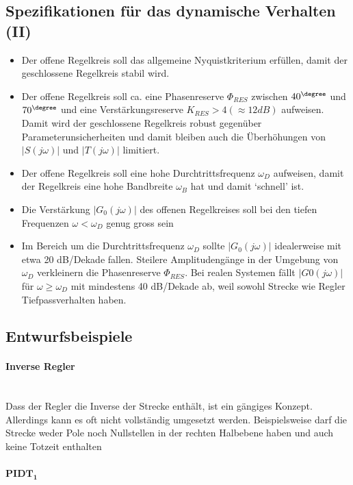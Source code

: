 \subsection{Spezifikationen für das dynamische Verhalten (II) }
\begin{itemize}
\item Der offene Regelkreis soll das allgemeine Nyquistkriterium
erfüllen, damit der geschlossene Regelkreis stabil wird.
\item Der offene Regelkreis soll ca. eine Phasenreserve $\Phi_{RES}$ zwischen $40^{\degree}$ und $70^{\degree}$
und eine Verstärkungsreserve $K_{RES} > 4 (\approx 12dB)$ aufweisen. Damit wird der
geschlossene Regelkreis robust gegenüber Parameterunsicherheiten und damit
bleiben auch die Überhöhungen von $|S(j\omega)|$ und $|T(j\omega)|$ limitiert.
\item Der offene Regelkreis soll eine hohe Durchtrittsfrequenz $\omega_D$ aufweisen, damit
der Regelkreis eine hohe Bandbreite $\omega_B$ hat und damit ‘schnell’ ist.
\item Die Verstärkung $|G_0(j\omega)|$ des offenen Regelkreises soll bei den tiefen Frequenzen
$\omega < \omega_D$ genug gross sein
\item Im Bereich um die Durchtrittsfrequenz $\omega_D$ sollte $|G_0(j\omega)|$ idealerweise mit
etwa 20 dB/Dekade fallen. Steilere Amplitudengänge in der Umgebung von
$\omega_D$ verkleinern die Phasenreserve $\Phi_{RES}$.\newline
Bei realen Systemen fällt $|G0(j\omega)|$ für $\omega \geqslant \omega_D$ mit mindestens 40 dB/Dekade
ab, weil sowohl Strecke wie Regler Tiefpassverhalten haben.
\end{itemize}
\subsection{Entwurfsbeispiele }
\paragraph{Inverse Regler } \mbox{} \\

    Dass der Regler die Inverse der Strecke enthält, ist ein gängiges Konzept. Allerdings
    kann es oft nicht vollständig umgesetzt werden. Beispielsweise darf die Strecke weder
    Pole noch Nullstellen in der rechten Halbebene haben und auch keine Totzeit enthalten

\paragraph{$\mathbf{PIDT_1}$ }

